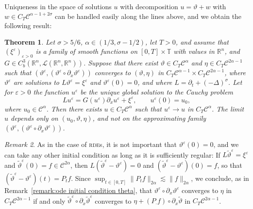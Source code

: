 \documentclass[11pt,a4paper]{article}
\newcommand{\cdummy}{\cdot}
\newtheorem{theorem}{Theorem}
\theoremstyle{remark}
\newtheorem{remark}[theorem]{Remark}
\newcommand{\Lcal}{\mathcal{L}}
\newcommand{\CC}{\ensuremath{\mathscr{C}}}
\begin{document}
Uniqueness in the space of solutions $u$ with decomposition $u= \vartheta +w$
with $w \in C_{T} \CC^{\alpha -1+2 \sigma}$ can be handled easily along the
lines above, and we obtain the following result:

\begin{theorem}\label{theorem:burgers existence uniqueness}
  Let $\sigma > 5/6$, $\alpha \in ( 1/3, \sigma -1/2 )$, let $T>0$,
  and assume that $( \xi^{\varepsilon} )_{\varepsilon >0}$ is a family of
  smooth functions on $[ 0,T ] \times \mathbb{T}$ with values in
  $\mathbb{R}^{n}$, and $G \in C^{3}_{b} ( \mathbb{R}^{n} ,\Lcal (\mathbb{R}^{n} ,\mathbb{R}^{n} ) )$. Suppose that there exist $\vartheta \in C_{T} \CC^{\alpha}$ and $\eta \in C_{T} \CC^{2 \alpha -1}$ such that $(\vartheta^{\varepsilon} , ( \vartheta^{\varepsilon} \circ   \partial_{x} \vartheta^{\varepsilon} ) )$ converges to $( \vartheta , \eta )$ in $C_{T}
  \CC^{\alpha -1} \times C_{T} \CC^{2 \alpha -1}$, where
  $\vartheta^{\varepsilon}$ are solutions to $L \vartheta^{\varepsilon} = \xi^{\varepsilon}$ and $\vartheta^{\varepsilon} ( 0 ) =0$, and where $L= \partial_{t} + ( - \Delta )^{\sigma}$. Let for $\varepsilon >0$ the function $u^{\varepsilon}$ be the unique global solution to the Cauchy problem
  \[
     L u^{\varepsilon} =G ( u^{\varepsilon} ) \partial_{x} u^{\varepsilon} + \xi^{\varepsilon} , \hspace{2em} u^{\varepsilon} ( 0 ) =u_{0} ,
  \]
  where $u_{0} \in \CC^{\alpha}$. Then there exists $u \in C_{T} \CC^{\alpha}$ such that $u^{\varepsilon} \rightarrow u$ in $C_{T} \CC^\alpha$. The limit $u$ depends only on $( u_{0} , \vartheta ,\eta )$, and not on the approximating family $( \vartheta^{\varepsilon} , (\vartheta^{\varepsilon} \circ   \partial_{x} \vartheta^{\varepsilon} ) )$.
\end{theorem}

\begin{remark}
  As in the case of \textsc{rde}s, it is not important that $\vartheta^{\varepsilon} ( 0 ) =0$, and we can take any other initial condition as long as it is
  sufficiently regular: If $L \tilde{\vartheta}^{\varepsilon} = \xi^{\varepsilon}$ and $\tilde{\vartheta}^{\varepsilon} ( 0 ) =f \in \CC^{2 \alpha}$, then $L ( \tilde{\vartheta}^{\varepsilon} -  \vartheta^{\varepsilon} ) =0$ and $( \tilde{\vartheta}^{\varepsilon} - \vartheta^{\varepsilon} ) ( 0 ) =f$, so that $(\tilde{\vartheta}^{\varepsilon} - \vartheta^{\varepsilon} ) ( t ) =P_{t} f$.  Since $\sup_{t \in [ 0,T ]} \| P_{t} f \|_{2 \alpha} \lesssim \| f \|_{2 \alpha}$, we conclude, as in Remark~\ref{remark:ode initial condition theta}, that $\vartheta^{\varepsilon} \circ \partial_{x}  \vartheta^{\varepsilon}$ converges to $\eta$ in $C_{T} \CC^{2 \alpha -1}$ if and only $\tilde{\vartheta}^{\varepsilon} \circ \partial_{x} \tilde{\vartheta}^{\varepsilon}$ converges to $\eta + ( P_{\cdummy} f ) \circ \partial_{x} \tilde{\vartheta}$ in $C_{T} \CC^{2 \alpha -1}$.
\end{remark}
\end{document}
